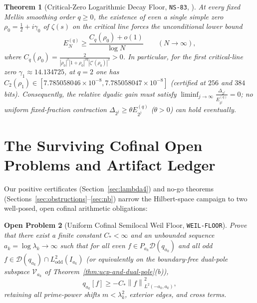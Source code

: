 \documentclass[11pt]{article}
\newtheorem{theorem}{Theorem}[section]
\newtheorem{openproblem}[theorem]{Open Problem}
\theoremstyle{remark}
\newcommand{\norm}[1]{\left\lVert #1\right\rVert}
\begin{document}
\begin{theorem}[Critical-Zero Logarithmic Decay Floor, \texttt{NS-83}, ]
\label{thm:nb-log-floor}
At every fixed Mellin smoothing order $q \ge 0$, the existence of even a single simple zero $\rho_0 = \tfrac{1}{2} + i\gamma_0$ of $\zeta(s)$ on the critical line forces the unconditional lower bound
\begin{equation}\label{eq:nb-log-floor}
  E_N^{(q)} \ge \frac{C_q(\rho_0) + o(1)}{\log N} \qquad (N \to \infty),
\end{equation}
where $C_q(\rho_0) = \frac{2}{|\rho_0|^2 |1+\rho_0|^{2q} |\zeta'(\rho_0)|^2} > 0$. In particular, for the first critical-line zero $\gamma_1 \approx 14.134725$, at $q = 2$ one has $C_2(\rho_1) \in [7.785058046 \times 10^{-8}, 7.785058047 \times 10^{-8}]$ (certified at $256$ and $384$ bits). Consequently, the relative dyadic gain must satisfy $\liminf_{j\to\infty} \frac{\Delta_{2^j}}{E_{2^j}^{(q)}} = 0$; no uniform fixed-fraction contraction $\Delta_{2^j} \ge \theta E_{2^j}^{(q)}$ ($\theta > 0$) can hold eventually.
\end{theorem}

\section{The Surviving Cofinal Open Problems and Artifact Ledger}
\label{sec:open-problems}

Our positive certificates (Section~\ref{sec:lambda4}) and no-go theorems (Sections~\ref{sec:obstructions}--\ref{sec:nb}) narrow the Hilbert-space campaign to two well-posed, open cofinal arithmetic obligations:

\begin{openproblem}[Uniform Cofinal Semilocal Weil Floor, \texttt{WEIL-FLOOR}]
\label{prob:weil-floor}
Prove that there exist a finite constant $C_* < \infty$ and an unbounded sequence $a_k = \log\lambda_k \to \infty$ such that for all even $f \in P_{a_k}\mathcal{D}(q_{a_k})$ and all odd $f \in \mathcal{D}(q_{a_k}) \cap L^2_{\mathrm{odd}}(I_{a_k})$ (or equivalently on the boundary-free dual-pole subspace $\mathcal{V}_{a_k}$ of Theorem~\ref{thm:ucp-and-dual-pole}(b)),
\begin{equation}
  q_{a_k}[f] \ge -C_*\norm{f}_{L^2(-a_k,a_k)}^2,
\end{equation}
retaining all prime-power shifts $m < \lambda_k^2$, exterior edges, and cross terms.
\end{openproblem}
\end{document}

